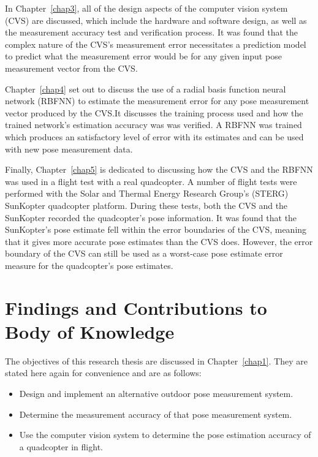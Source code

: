 In Chapter~\ref{chap3}, all of the design aspects of the computer vision system (CVS) are discussed, which include the hardware and software design, as well as the measurement accuracy test and verification process. It was found that the complex nature of the CVS's measurement error necessitates a prediction model to predict what the measurement error would be for any given input pose measurement vector from the CVS.\@ 

Chapter~\ref{chap4} set out to discuss the use of a radial basis function neural network (RBFNN) to estimate the measurement error for any pose measurement vector produced by the CVS.\@ It discusses the training process used and how the trained network's estimation accuracy was was verified. A RBFNN was trained which produces an satisfactory level of error with its estimates and can be used with new pose measurement data.

Finally, Chapter~\ref{chap5} is dedicated to discussing how the CVS and the RBFNN was used in a flight test with a real quadcopter. A number of flight tests were performed with the Solar and Thermal Energy Research Group's (STERG) SunKopter quadcopter platform. During these tests, both the CVS and the SunKopter recorded the quadcopter's pose information. It was found that the SunKopter's pose estimate fell within the error boundaries of the CVS, meaning that it gives more accurate pose estimates than the CVS does. However, the error boundary of the CVS can still be used as a worst-case pose estimate error measure for the quadcopter's pose estimates. 

\section{Findings and Contributions to Body of Knowledge}

The objectives of this research thesis are discussed in Chapter~\ref{chap1}. They are stated here again for convenience and are as follows:

\begin{itemize}
  \item Design and implement an alternative outdoor pose measurement system.
  \item Determine the measurement accuracy of that pose measurement system.
  \item Use the computer vision system to determine the pose estimation accuracy of a quadcopter in flight. 
\end{itemize}

